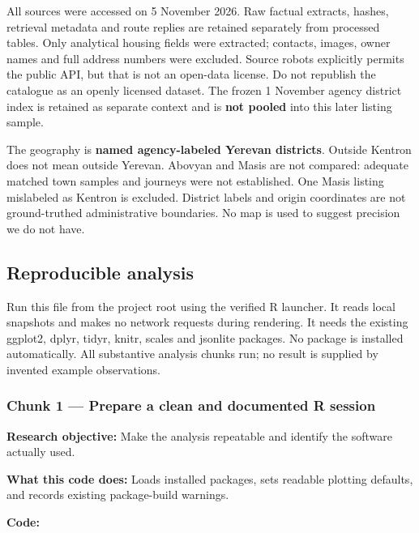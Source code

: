 \documentclass[
]{article}
\begin{document}
All sources were accessed on 5 November 2026. Raw factual extracts,
hashes, retrieval metadata and route replies are retained separately
from processed tables. Only analytical housing fields were extracted;
contacts, images, owner names and full address numbers were excluded.
Source robots explicitly permits the public API, but that is not an
open-data license. Do not republish the catalogue as an openly licensed
dataset. The frozen 1 November agency district index is retained as
separate context and is \textbf{not pooled} into this later listing
sample.

The geography is \textbf{named agency-labeled Yerevan districts}.
Outside Kentron does not mean outside Yerevan. Abovyan and Masis are not
compared: adequate matched town samples and journeys were not
established. One Masis listing mislabeled as Kentron is excluded.
District labels and origin coordinates are not ground-truthed
administrative boundaries. No map is used to suggest precision we do not
have.

\subsection{Reproducible analysis}\label{reproducible-analysis}

Run this file from the project root using the verified R launcher. It
reads local snapshots and makes no network requests during rendering. It
needs the existing ggplot2, dplyr, tidyr, knitr, scales and jsonlite
packages. No package is installed automatically. All substantive
analysis chunks run; no result is supplied by invented example
observations.

\subsubsection{Chunk 1 --- Prepare a clean and documented R
session}\label{chunk-1-prepare-a-clean-and-documented-r-session}

\textbf{Research objective:} Make the analysis repeatable and identify
the software actually used.

\textbf{What this code does:} Loads installed packages, sets readable
plotting defaults, and records existing package-build warnings.

\textbf{Code:}
\end{document}
